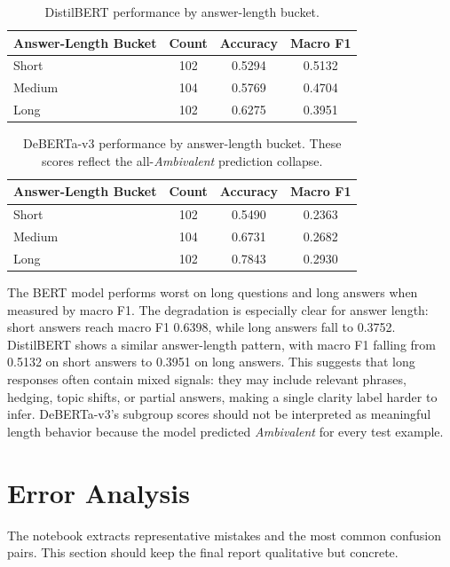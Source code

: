 \begin{table}[h]
\centering
\small
\begin{tabularx}{\textwidth}{Xccc}
\toprule
Answer-Length Bucket & Count & Accuracy & Macro F1 \\
\midrule
Short & 102 & 0.5294 & 0.5132 \\
Medium & 104 & 0.5769 & 0.4704 \\
Long & 102 & 0.6275 & 0.3951 \\
\bottomrule
\end{tabularx}
\caption{DistilBERT performance by answer-length bucket.}
\label{tab:distilbert-answer-subgroups}
\end{table}

\begin{table}[h]
\centering
\small
\begin{tabularx}{\textwidth}{Xccc}
\toprule
Answer-Length Bucket & Count & Accuracy & Macro F1 \\
\midrule
Short & 102 & 0.5490 & 0.2363 \\
Medium & 104 & 0.6731 & 0.2682 \\
Long & 102 & 0.7843 & 0.2930 \\
\bottomrule
\end{tabularx}
\caption{DeBERTa-v3 performance by answer-length bucket. These scores reflect the all-\emph{Ambivalent} prediction collapse.}
\label{tab:deberta-answer-subgroups}
\end{table}

The BERT model performs worst on long questions and long answers when measured by macro F1. The degradation is especially clear for answer length: short answers reach macro F1 0.6398, while long answers fall to 0.3752. DistilBERT shows a similar answer-length pattern, with macro F1 falling from 0.5132 on short answers to 0.3951 on long answers. This suggests that long responses often contain mixed signals: they may include relevant phrases, hedging, topic shifts, or partial answers, making a single clarity label harder to infer. DeBERTa-v3's subgroup scores should not be interpreted as meaningful length behavior because the model predicted \emph{Ambivalent} for every test example.

\section{Error Analysis}

The notebook extracts representative mistakes and the most common confusion pairs. This section should keep the final report qualitative but concrete.


